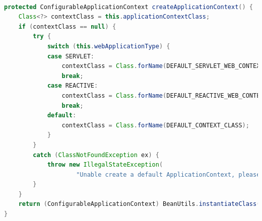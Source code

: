 \clearpage

\begin{lstlisting}[language=Java, caption={Determination of Application Context \cite{createapplicationcontext:online}}, label=ApplicationContext]

protected ConfigurableApplicationContext createApplicationContext() {
	Class<?> contextClass = this.applicationContextClass;
	if (contextClass == null) {
		try {
			switch (this.webApplicationType) {
			case SERVLET:
				contextClass = Class.forName(DEFAULT_SERVLET_WEB_CONTEXT_CLASS);
				break;
			case REACTIVE:
				contextClass = Class.forName(DEFAULT_REACTIVE_WEB_CONTEXT_CLASS);
				break;
			default:
				contextClass = Class.forName(DEFAULT_CONTEXT_CLASS);
			}
		}
		catch (ClassNotFoundException ex) {
			throw new IllegalStateException(
					"Unable create a default ApplicationContext, please specify an ApplicationContextClass", ex);
		}
	}
	return (ConfigurableApplicationContext) BeanUtils.instantiateClass(contextClass);
}
	
\end{lstlisting}\ \\

